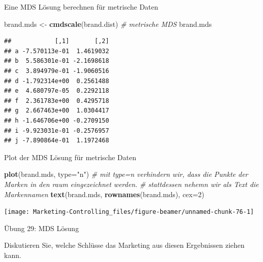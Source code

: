 \documentclass[12pt,ngerman,a4paper,ignorenonframetext,]{beamer}
\newenvironment{Shaded}{\begin{snugshade}}{\end{snugshade}}
\newcommand{\CommentTok}[1]{\textcolor[rgb]{0.56,0.35,0.01}{\textit{#1}}}
\newcommand{\DataTypeTok}[1]{\textcolor[rgb]{0.13,0.29,0.53}{#1}}
\newcommand{\DecValTok}[1]{\textcolor[rgb]{0.00,0.00,0.81}{#1}}
\newcommand{\KeywordTok}[1]{\textcolor[rgb]{0.13,0.29,0.53}{\textbf{#1}}}
\newcommand{\NormalTok}[1]{#1}
\newcommand{\StringTok}[1]{\textcolor[rgb]{0.31,0.60,0.02}{#1}}
\begin{document}
\begin{frame}{Eine MDS Lösung berechnen für metrische
Daten}
\protect\hypertarget{eine-mds-losung-berechnen-fur-metrische-daten}{}

\begin{Shaded}
\begin{Highlighting}[]
\NormalTok{brand.mds <-}\StringTok{ }\KeywordTok{cmdscale}\NormalTok{(brand.dist) }\CommentTok{# metrische MDS}
\NormalTok{brand.mds}
\end{Highlighting}
\end{Shaded}

\begin{verbatim}
##            [,1]       [,2]
## a -7.570113e-01  1.4619032
## b  5.586301e-01 -2.1698618
## c  3.894979e-01 -1.9060516
## d -1.792314e+00  0.2561488
## e  4.680797e-05  0.2292118
## f  2.361783e+00  0.4295718
## g  2.667463e+00  1.0304417
## h -1.646706e+00 -0.2709150
## i -9.923031e-01 -0.2576957
## j -7.890864e-01  1.1972468
\end{verbatim}

\end{frame}

\begin{frame}{Plot der MDS Lösung für metrische Daten}
\protect\hypertarget{plot-der-mds-losung-fur-metrische-daten}{}

\begin{Shaded}
\begin{Highlighting}[]
\KeywordTok{plot}\NormalTok{(brand.mds, }\DataTypeTok{type=}\StringTok{"n"}\NormalTok{) }
\CommentTok{# mit type=n verhindern wir, dass die Punkte der Marken in den raum eingezeichnet werden.  }
\CommentTok{# stattdessen nehemn wir als Text die Markennamen}
\KeywordTok{text}\NormalTok{(brand.mds, }\KeywordTok{rownames}\NormalTok{(brand.mds), }\DataTypeTok{cex=}\DecValTok{2}\NormalTok{)}
\end{Highlighting}
\end{Shaded}

\begin{center}\texttt{[image: Marketing-Controlling\_files/figure-beamer/unnamed-chunk-76-1]} \end{center}

\end{frame}

\begin{frame}{Übung 29: MDS Lösung}
\protect\hypertarget{ubung-29-mds-losung}{}

Diskutieren Sie, welche Schlüsse das Marketing aus diesen Ergebnissen
ziehen kann.


\end{frame}
\end{document}
